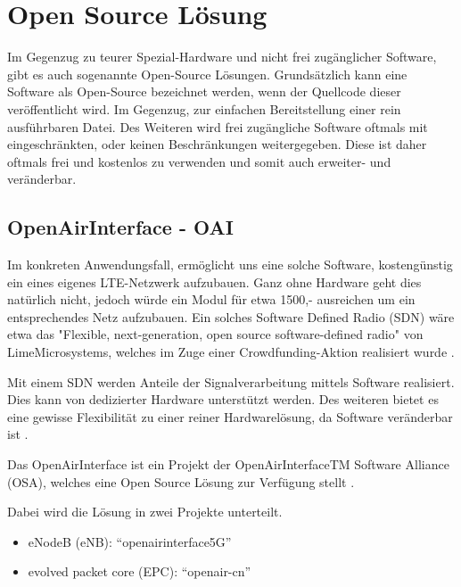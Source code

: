 
%
%
% 
% 
% 

\section{Open Source Lösung}
\label{sec:open_source}

Im Gegenzug zu teurer Spezial-Hardware und nicht frei zugänglicher Software, gibt es auch sogenannte Open-Source Lösungen. Grundsätzlich kann eine Software als Open-Source bezeichnet werden, wenn der Quellcode dieser veröffentlicht wird. Im Gegenzug, zur einfachen Bereitstellung einer rein ausführbaren Datei.
Des Weiteren wird frei zugängliche Software oftmals mit eingeschränkten, oder keinen Beschränkungen weitergegeben. Diese ist daher oftmals frei und kostenlos zu verwenden und somit auch erweiter- und veränderbar. \cite{gacek2004many}

\subsection{OpenAirInterface - OAI}
Im konkreten Anwendungsfall, ermöglicht uns eine solche Software, kostengünstig ein eines eigenes LTE-Netzwerk aufzubauen. 
Ganz ohne Hardware geht dies natürlich nicht, jedoch würde ein Modul für etwa 1500,- ausreichen um ein entsprechendes Netz aufzubauen. Ein solches Software Defined Radio (SDN) wäre etwa das "Flexible, next-generation, open source software-defined radio" von LimeMicrosystems, welches im Zuge einer Crowdfunding-Aktion realisiert wurde \cite{CroudLime01}. 

Mit einem SDN werden Anteile der Signalverarbeitung mittels Software realisiert. Dies kann von dedizierter Hardware unterstützt werden. Des weiteren bietet es eine gewisse Flexibilität zu einer reiner Hardwarelösung, da Software veränderbar ist \cite{jondral2005software}. 

Das OpenAirInterface ist ein Projekt der OpenAirInterfaceTM Software Alliance (OSA), welches eine Open Source Lösung zur Verfügung stellt \cite{OpenAir19}.

Dabei wird die Lösung in zwei Projekte unterteilt. 
\begin{itemize}
	\item eNodeB (eNB): “openairinterface5G”
	\item evolved packet core (EPC): “openair-cn”
\end{itemize}

